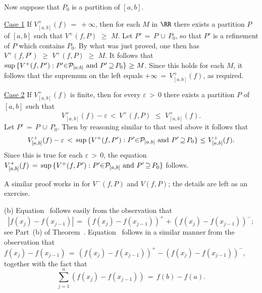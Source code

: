         Now suppose that $P_{0}$ is a partition of $[a,b]$.

        \underline{Case 1} If $V^{+}_{[a,b]}(f) \,=\, +{\infty}$,
    then for each $M$ in ${\RR}$ there exists a partition $P$ of $[a,b]$ such that $V^{+}(f,P)\,\,{\geq}\,\,M$.
    Let $P' \,=\, P\,{\cup}\,P_{0}$, so that $P'$ is a refinement of $P$ which contains $P_{0}$.
    By what was just proved, one then has
        $V^{+}(f,P')\,\,{\geq}\,\,V^{+}(f,P)\,\,{\geq}\,\,M$.
    It follows that
        ${\sup}\,\{V^{+}(f,P'): P'{\in}{\cal P}_{[a,b]} \mbox{ and } P' \,{\supseteq}\, P_{0}\}\,\,{\geq}\,\,M$.
    Since this holds for each $M$, it follows that the supremum on the left equals $+{\infty} \,=\, V^{+}_{[a,b]}(f)$, as required.

        \underline{Case 2} If $V^{+}_{[a,b]}(f)$ is finite, then for every ${\varepsilon}\,>\,0$ there exists a partition $P$ of $[a,b]$ such that
        \begin{displaymath}
        V^{+}_{[a,b]}(f)-{\varepsilon}\,<\,V^{+}(f,P)\,\,{\leq}\,\,V^{+}_{[a,b]}(f).
        \end{displaymath}
    Let $P' \,=\, P\,{\cup}\,P_{0}$. Then by reasoning similar to that used above it follows that
        \begin{displaymath}
        V^{+}_{[a,b]}(f)-{\varepsilon}\,<\,{\sup}\,\{V^{+}(f,P'): P'{\in}{\cal P}_{[a,b]} \mbox{ and } P' \,{\supseteq}\, P_{0}\}\,\,{\leq}\,\,V^{+}_{[a,b]}(f).
        \end{displaymath}
    Since this is true for each ${\varepsilon}\,>\,0$, the equation $V^{+}_{[a,b]}(f) \,=\, {\sup}\,\{V^{+}(f,P'): P'{\in}{\cal P}_{[a,b]} \mbox{ and } P' \,{\supseteq}\, P_{0}\}$ follows.


        A similar proof works in for $V^{-}(f,P)$ and $V(f,P)$; the details are left as an exercise.



\V

        (b) Equation~ follows easily from the observation that
        \begin{displaymath}
        |f(x_{j})-f(x_{j-1})| \,=\
        \left(f(x_{j})-f(x_{j-1})\right)^{+} + \left(f(x_{j})-f(x_{j-1})\right)^{-};
        \end{displaymath}
    see Part~(b) of Theorem~.
    Equation~ follows in a similar manner from the observation that
        $f(x_{j})-f(x_{j-1}) \,=\, \left(f(x_{j})-f(x_{j-1})\right)^{+} - \left(f(x_{j})-f(x_{j-1})\right)^{-}$,
    together with the fact that
        \begin{displaymath}
        \sum_{j=1}^{n} (f(x_{j})-f(x_{j-1})) \,=\, f(b)-f(a).
        \end{displaymath}

